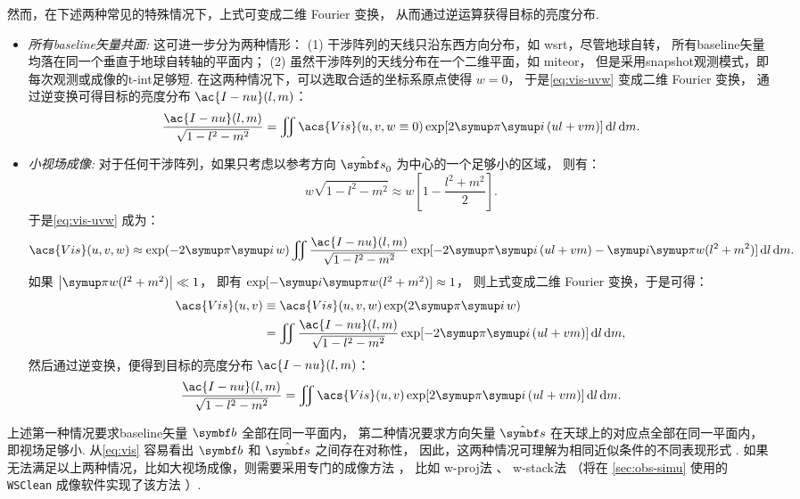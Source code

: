 然而，在下述两种常见的特殊情况下，上式可变成二维 Fourier 变换，
从而通过逆运算获得目标的亮度分布.
\begin{itemize}
\item
\emph{所有\ac{baseline}矢量共面:}
这可进一步分为两种情形：
(1) 干涉阵列的天线只沿东西方向分布，如 \ac{wsrt}，尽管地球自转，
所有\ac{baseline}矢量均落在同一个垂直于地球自转轴的平面内；
(2) 虽然干涉阵列的天线分布在一个二维平面，如 \ac{miteor}，
但是采用\ac{snapshot}观测模式，即每次观测或成像的\ac{t-int}足够短.
在这两种情况下，可以选取合适的坐标系原点使得 $w = 0$，
于是\autoref{eq:vis-uvw} 变成二维 Fourier 变换，
通过逆变换可得目标的亮度分布 $\ac{I-nu}(l,m)$：
\begin{equation}
  \label{eq:vis-inv1}
  \frac{\ac{I-nu}(l,m)}{\sqrt{1-l^2-m^2}}
    = \iint \acs{Vis}(u,v, w \equiv 0)
      \exp [2\Cpi\Ci\, (ul+vm)] \,\D{l}\,\D{m}.
\end{equation}

\item
\emph{小视场成像:}
对于任何干涉阵列，如果只考虑以参考方向 $\hat{\B{s}}_0$ 为中心的一个足够小的区域，
则有：
\begin{equation}
  w \sqrt{1-l^2-m^2}
    \approx w \left[ 1 - \frac{l^2+m^2}{2} \right].
\end{equation}
于是\autoref{eq:vis-uvw} 成为：
\begin{equation}
  \acs{Vis}(u,v,w) \approx \exp (-2\Cpi\Ci\,w) \iint
    \frac{\ac{I-nu}(l,m)}{\sqrt{1-l^2-m^2}}
    \exp [-2\Cpi\Ci\, (ul+vm) -\Ci\Cpi w(l^2+m^2)] \,\D{l}\,\D{m}.
\end{equation}
如果 $\big| \Cpi w(l^2+m^2) \big| \ll 1$，
即有 $\exp [-\Ci\Cpi w(l^2+m^2)] \approx 1$，
则上式变成二维 Fourier 变换，于是可得：
\begin{align}
  \acs{Vis}(u,v)
    & \equiv \acs{Vis}(u,v,w) \exp (2\Cpi\Ci\,w)  \\
    & = \iint \frac{\ac{I-nu}(l,m)}{\sqrt{1-l^2-m^2}}
    \exp [-2\Cpi\Ci\, (ul+vm)] \,\D{l}\,\D{m},
  \label{eq:vis-uv}
\end{align}
然后通过逆变换，便得到目标的亮度分布 $\ac{I-nu}(l,m)$：
\begin{equation}
  \label{eq:vis-inv2}
  \frac{\ac{I-nu}(l,m)}{\sqrt{1-l^2-m^2}}
    = \iint \acs{Vis}(u,v)
      \exp [2\Cpi\Ci\, (ul+vm)] \,\D{l}\,\D{m}.
\end{equation}

\end{itemize}

上述第一种情况要求\ac{baseline}矢量 $\B{b}$ 全部在同一平面内，
第二种情况要求方向矢量 $\hat{\B{s}}$ 在天球上的对应点全部在同一平面内，即视场足够小.
从\autoref{eq:vis} 容易看出 $\B{b}$ 和 $\hat{\B{s}}$ 之间存在对称性，
因此，这两种情况可理解为相同近似条件的不同表现形式 \cite{clark1999}.
如果无法满足以上两种情况，比如大视场成像，则需要采用专门的成像方法
\cite{cornwell1992,sault2007}，
比如 \ac{w-proj}法 \cite{cornwell2008}、
\ac{w-stack}法 \cite{humphreys2011}
（将在 \autoref{sec:obs-simu} 使用的 \texttt{WSClean} 成像软件实现了该方法
\cite{offringa2014,offringa2017}）.

